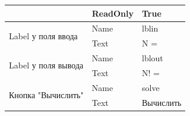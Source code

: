 \begin{table}[H]
\begin{tabular}{|l|l|l|}
                                                                                    & ReadOnly                                                                       & True                                                                       \\ \hline
\multirow{2}{*}{Label у поля ввода}                                                 & Name                                                                           & lblin                                                                      \\ \cline{2-3} 
                                                                                    & Text                                                                           & N =                                                                        \\ \hline
\multirow{2}{*}{Label у поля вывода}                                                & Name                                                                           & lblout                                                                     \\ \cline{2-3} 
                                                                                    & Text                                                                           & N! =                                                                       \\ \hline
\multirow{2}{*}{Кнопка "Вычислить"}                                                 & Name                                                                           & solve                                                                      \\ \cline{2-3} 
                                                                                    & Text                                                                           & Вычислить                                                                  \\ \hline
\end{tabular}

\label{task1_attributes}
\end{table}


